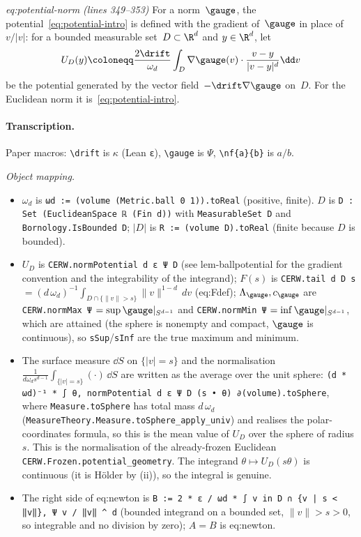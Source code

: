 \textit{eq:potential-norm (lines 349--353)}
For a norm~$\gauge$, the potential~\eqref{eq:potential-intro} is defined with the gradient of~$\gauge$ in place of~$v/|v|$: for a bounded measurable set~$D\subset\R^d$ and $y\in\R^d$, let
\begin{equation}\label{eq:potential-norm}
U_D(y)\coloneqq\frac{2\drift}{\omega_d}\int_D\nabla\gauge(v)\cdot\frac{v-y}{|v-y|^d}\dd v
\end{equation}
be the potential generated by the vector field~$-\drift\nabla\gauge$ on~$D$. For the Euclidean norm it is~\eqref{eq:potential-intro}.
\paragraph{Transcription.}
Paper macros: \verb!\drift! is $\kappa$ (Lean \verb!ε!), \verb!\gauge! is $\Psi$, \verb!\nf{a}{b}! is $a/b$.

\emph{Object mapping.}
\begin{itemize}
\item $\omega_d$ is \verb!ωd := (volume (Metric.ball 0 1)).toReal! (positive, finite). $D$ is \verb!D : Set (EuclideanSpace ℝ (Fin d))! with \verb!MeasurableSet D! and \verb!Bornology.IsBounded D!; $|D|$ is \verb!R := (volume D).toReal! (finite because $D$ is bounded).
\item $U_D$ is \verb!CERW.normPotential d ε Ψ D! (see lem-ballpotential for the gradient convention and the integrability of the integrand); $F(s)$ is \verb!CERW.tail d D s! $=(d\,\omega_d)^{-1}\int_{D\cap\{\|v\|>s\}}\|v\|^{1-d}\,dv$ (eq:Fdef); $\Lambda_\gauge,c_\gauge$ are \verb!CERW.normMax Ψ! $=\sup\gauge|_{S^{d-1}}$ and \verb!CERW.normMin Ψ! $=\inf\gauge|_{S^{d-1}}$, which are attained (the sphere is nonempty and compact, $\gauge$ is continuous), so \verb!sSup!/\verb!sInf! are the true maximum and minimum.
\item The surface measure $\dd S$ on $\{|v|=s\}$ and the normalisation $\tfrac1{d\omega_ds^{d-1}}\int_{\{|v|=s\}}(\cdot)\,\dd S$ are written as the average over the unit sphere: \verb!(d * ωd)⁻¹ * ∫ θ, normPotential d ε Ψ D (s • θ) ∂(volume).toSphere!, where \verb!Measure.toSphere! has total mass $d\,\omega_d$ (\verb!MeasureTheory.Measure.toSphere_apply_univ!) and realises the polar-coordinates formula, so this is the mean value of $U_D$ over the sphere of radius $s$. This is the normalisation of the already-frozen Euclidean \verb!CERW.Frozen.potential_geometry!. The integrand $\theta\mapsto U_D(s\theta)$ is continuous (it is Hölder by (ii)), so the integral is genuine.
\item The right side of eq:newton is \verb!B := 2 * ε / ωd * ∫ v in D ∩ {v | s < ‖v‖}, Ψ v / ‖v‖ ^ d! (bounded integrand on a bounded set, $\|v\|>s>0$, so integrable and no division by zero); $A=B$ is eq:newton.
\end{itemize}

